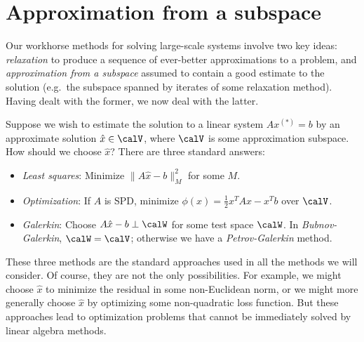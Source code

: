 \section{Approximation from a subspace}

Our workhorse methods for solving large-scale systems involve two
key ideas: {\em relaxation} to produce a sequence of ever-better
approximations to a problem, and {\em approximation from a subspace}
assumed to contain a good estimate to the solution (e.g.~the subspace
spanned by iterates of some relaxation method).  Having dealt with the
former, we now deal with the latter.

Suppose we wish to estimate the solution to a linear system $Ax^{(*)} = b$ by
an approximate solution $\hat{x} \in \calV$, where $\calV$ is some
approximation subspace.  How should we choose $\hat{x}$?  There are
three standard answers:
\begin{itemize}
\item {\em Least squares}: Minimize $\|A\hat{x}-b\|_M^2$ for some $M$.
\item {\em Optimization}: If $A$ is SPD, minimize $\phi(x) = \frac{1}{2} x^T A x - x^T b$ over $\calV$.
\item {\em Galerkin}: Choose $A\hat{x}-b \perp \calW$ for some test space $\calW$.  In {\em Bubnov-Galerkin}, $\calW = \calV$; otherwise we have
a {\em Petrov-Galerkin} method.
\end{itemize}
These three methods are the standard approaches used in all the methods
we will consider.  Of course, they are not the only possibilities.
For example, we might choose $\hat{x}$ to minimize the residual in
some non-Euclidean norm, or we might more generally choose $\hat{x}$
by optimizing some non-quadratic loss function.  But these approaches lead
to optimization problems that cannot be immediately solved by linear
algebra methods.

